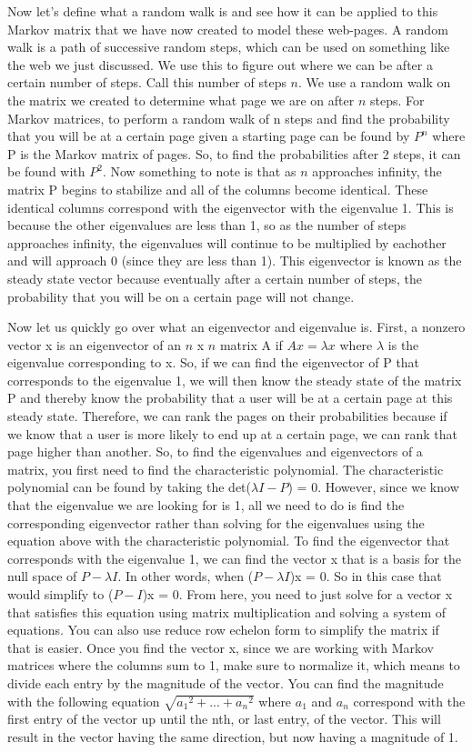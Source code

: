 \documentclass{article}
\begin{document}
Now let's define what a random walk is and see how it can be applied to this Markov matrix that we have now created to model these web-pages. A random walk is a path of successive random steps, which can be used on something like the web we just discussed. We use this to figure out where we can be after a certain number of steps. Call this number of steps $n$. We use a random walk on the matrix we created to determine what page we are on after $n$ steps. For Markov matrices, to perform a random walk of n steps and find the probability that you will be at a certain page given a starting page can be found by $P^n$ where P is the Markov matrix of pages. So, to find the probabilities after 2 steps, it can be found with $P^2$. Now something to note is that as $n$ approaches infinity, the matrix P begins to stabilize and all of the columns become identical. These identical columns correspond with the eigenvector with the eigenvalue 1. This is because the other eigenvalues are less than 1, so as the number of steps approaches infinity, the eigenvalues will continue to be multiplied by eachother and will approach 0 (since they are less than 1). This eigenvector is known as the steady state vector because eventually after a certain number of steps, the probability that you will be on a certain page will not change.

Now let us quickly go over what an eigenvector and eigenvalue is. First, a nonzero vector x is an eigenvector of an $n$ x $n$ matrix A if $Ax = \lambda x$ where $\lambda$ is the eigenvalue corresponding to x. So, if we can find the eigenvector of P that corresponds to the eigenvalue 1, we will then know the steady state of the matrix P and thereby know the probability that a user will be at a certain page at this steady state. Therefore, we can rank the pages on their probabilities because if we know that a user is more likely to end up at a certain page, we can rank that page higher than another. So, to find the eigenvalues and eigenvectors of a matrix, you first need to find the characteristic polynomial. The characteristic polynomial can be found by taking the det($\lambda I - P$) = 0. However, since we know that the eigenvalue we are looking for is 1, all we need to do is find the corresponding eigenvector rather than solving for the eigenvalues using the equation above with the characteristic polynomial. To find the eigenvector that corresponds with the eigenvalue 1, we can find the vector x that is a basis for the null space of $P-\lambda I$. In other words, when ($P-\lambda I$)x = 0. So in this case that would simplify to ($P-I$)x = 0. From here, you need to just solve for a vector x that satisfies this equation using matrix multiplication and solving a system of equations. You can also use reduce row echelon form to simplify the matrix if that is easier.  Once you find the vector x, since we are working with Markov matrices where the columns sum to 1, make sure to normalize it, which means to divide each entry by the magnitude of the vector. You can find the magnitude with the following equation $\sqrt{{a_1}^2 + . . . + {a_n}^2}$ where $a_1$ and $a_n$ correspond with the first entry of the vector up until the nth, or last entry, of the vector. This will result in the vector having the same direction, but now having a magnitude of 1. 
\end{document}

